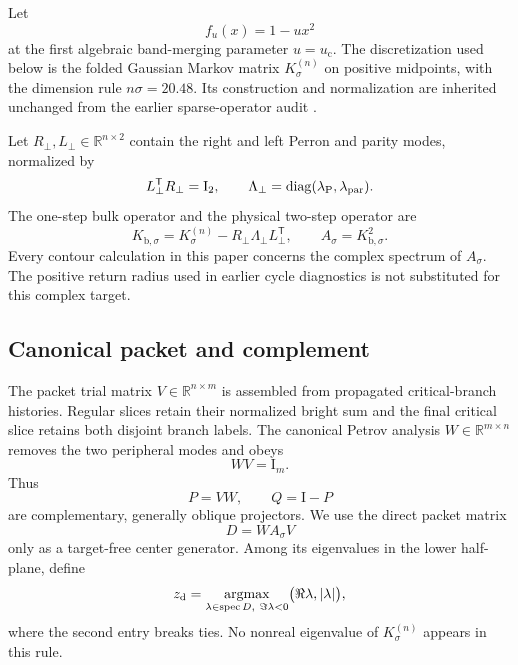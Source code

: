 \documentclass[11pt]{article}
\theoremstyle{definition}
\theoremstyle{remark}
\newcommand{\R}{\mathbb R}
\newcommand{\uc}{u_{\mathrm c}}
\newcommand{\Id}{\mathrm I}
\newcommand{\spec}{\operatorname{spec}}
\begin{document}
Let
\[
 f_u(x)=1-u x^2
\]
at the first algebraic band-merging parameter $u=\uc$.  The discretization
used below is the folded Gaussian Markov matrix $K_\sigma^{(n)}$ on positive
midpoints, with the dimension rule $n\sigma=20.48$.  Its construction and
normalization are inherited unchanged from the earlier sparse-operator
audit \citep{WangBulkScattering2026,WangPhysicalFeshbach2026}.

Let $R_\perp,L_\perp\in\R^{n\times2}$ contain the right and left Perron and
parity modes, normalized by
\[
 L_\perp^{\mathsf T}R_\perp=\Id_2,
\qquad
 \Lambda_\perp=\operatorname{diag}(\lambda_{\rm P},\lambda_{\rm par}).
\]
The one-step bulk operator and the physical two-step operator are
\begin{equation}
 K_{\mathrm b,\sigma}
 =K_\sigma^{(n)}-R_\perp\Lambda_\perp L_\perp^{\mathsf T},
 \qquad
 A_\sigma=K_{\mathrm b,\sigma}^2.
 \label{eq:bulk-two-step}
\end{equation}
Every contour calculation in this paper concerns the complex spectrum of
$A_\sigma$.  The positive return radius used in earlier cycle diagnostics
is not substituted for this complex target.

\subsection{Canonical packet and complement}

The packet trial matrix $V\in\R^{n\times m}$ is assembled from propagated
critical-branch histories.  Regular slices retain their normalized bright
sum and the final critical slice retains both disjoint branch labels.  The
canonical Petrov analysis $W\in\R^{m\times n}$ removes the two peripheral
modes and obeys
\begin{equation}
 WV=\Id_m.
 \label{eq:biorthogonal-pair}
\end{equation}
Thus
\[
 P=VW,
 \qquad Q=\Id-P
\]
are complementary, generally oblique projectors.  We use the direct packet
matrix
\begin{equation}
 D=W A_\sigma V
 \label{eq:direct-matrix}
\end{equation}
only as a target-free center generator.  Among its eigenvalues in the lower
half-plane, define
\begin{equation}
 z_{\rm d}
 =\underset{\lambda\in\spec D,\ \Im\lambda<0}{\operatorname{argmax}}
 \bigl(\Re\lambda,|\lambda|\bigr),
 \label{eq:direct-center-rule}
\end{equation}
where the second entry breaks ties.  No nonreal eigenvalue of
$K_\sigma^{(n)}$ appears in this rule.
\end{document}
